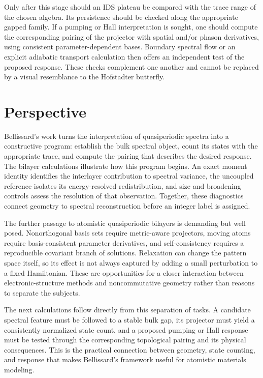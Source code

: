 \documentclass[11pt,a4paper]{article}
\begin{document}
Only after this stage should an IDS plateau be compared with the trace range of the chosen algebra. Its persistence should be checked along the appropriate gapped family. If a pumping or Hall interpretation is sought, one should compute the corresponding pairing of the projector with spatial and/or phason derivatives, using consistent parameter-dependent bases. Boundary spectral flow or an explicit adiabatic transport calculation then offers an independent test of the proposed response. These checks complement one another and cannot be replaced by a visual resemblance to the Hofstadter butterfly.

\section{Perspective}

Bellissard's work turns the interpretation of quasiperiodic spectra into a constructive program: establish the bulk spectral object, count its states with the appropriate trace, and compute the pairing that describes the desired response. The bilayer calculations illustrate how this program begins. An exact moment identity identifies the interlayer contribution to spectral variance, the uncoupled reference isolates its energy-resolved redistribution, and size and broadening controls assess the resolution of that observation. Together, these diagnostics connect geometry to spectral reconstruction before an integer label is assigned.

The further passage to atomistic quasiperiodic bilayers is demanding but well posed. Nonorthogonal basis sets require metric-aware projectors, moving atoms require basis-consistent parameter derivatives, and self-consistency requires a reproducible covariant branch of solutions. Relaxation can change the pattern space itself, so its effect is not always captured by adding a small perturbation to a fixed Hamiltonian. These are opportunities for a closer interaction between electronic-structure methods and noncommutative geometry rather than reasons to separate the subjects.

The next calculations follow directly from this separation of tasks. A candidate spectral feature must be followed to a stable bulk gap, its projector must yield a consistently normalized state count, and a proposed pumping or Hall response must be tested through the corresponding topological pairing and its physical consequences. This is the practical connection between geometry, state counting, and response that makes Bellissard's framework useful for atomistic materials modeling.
\end{document}
